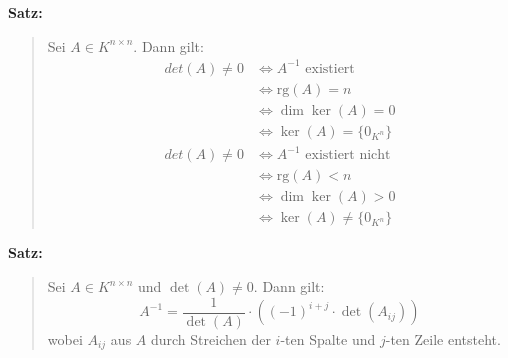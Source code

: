 \documentclass{article}
\newcommand{\dgr}[1]{\textcolor{dgr}{#1}}
\newcommand{\se}[1]{\dgr{\textbf{Satz: }}\begin{quote}#1\end{quote}}
\newcommand{\rg}{\text{rg}}
\begin{document}
\se{
    Sei $A \in K^{n \times n}$. Dann gilt:
    \begin{align*}
        det(A) \ne 0 &\iff A^{-1} \text{ existiert}\\
        &\iff \rg(A) = n\\
        &\iff \dim \ker(A) = 0\\
        &\iff \ker(A) = \{0_{K^n}\}
    \end{align*}
    \begin{align*}
        det(A) \ne 0 &\iff A^{-1} \text{ existiert nicht}\\
        &\iff \rg(A) < n\\
        &\iff \dim \ker(A) > 0\\
        &\iff \ker(A) \ne \{0_{K^n}\}
    \end{align*}
}

\se{
    Sei $A \in K^{n  \times n}$ und $\det(A) \ne 0$. Dann gilt:
    \[
        A^{-1} = \frac{1}{\det(A)} \cdot ((-1)^{i+j} \cdot \det(A_{ij}))   
    \]
    wobei $A_{ij}$ aus $A$ durch Streichen der $i$-ten Spalte und $j$-ten Zeile entsteht.
}
\end{document}
